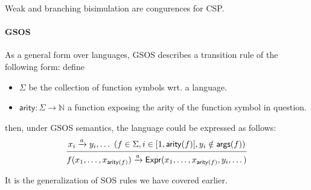 \documentclass[99-notes-packed.tex]{subfiles}
\begin{document}
Weak and branching bisimulation are congurences for CSP.

\paragraph*{GSOS}
As a general form over languages, GSOS describes a transition rule of the following form: define 
\begin{itemize}
    \item {
        $\Sigma$ be the collection of function symbols wrt. a language. 
    }
    \item {
        $\mathsf{arity}: \Sigma \rightarrow \mathbb{N}$ a function exposing the arity of the function symbol in question.
    }
\end{itemize}
then, under GSOS semantics, the language could be expressed as follows: 
\begin{equation*}
    \begin{prooftree}
        \hypo{x_i \xrightarrow{a} y_i, \dots\ (f \in \Sigma, i \in [1, \mathsf{arity}(f)], y_i \notin \mathsf{args}(f))}
        \infer1{f(x_1, \dots, x_{\mathsf{arity}(f)}) \xrightarrow{a} \mathsf{Expr}(x_1, \dots, x_{\mathsf{arity}(f)}, y_i, \dots)}
    \end{prooftree}
\end{equation*}

It is the generalization of SOS rules we have covered earlier.
\end{document}
